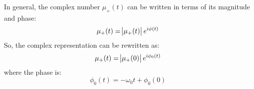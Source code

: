 \begin{enumerate}
    In general, the complex number ${\mu_{+}}(t)$ can be written in terms of its magnitude and phase:
    \begin{equation}
        {\mu_{+}}(t) = \abs{{\mu_{+}}(t)} e^{i\phi (t)}
    \end{equation}
    So, the complex representation can be rewritten as:
    \begin{equation}
        {\mu_{+}}(t) = \abs{{\mu_{+}}(0)} e^{i\phi_0 (t)}
    \end{equation}
    where the phase is:
    \begin{equation}
        \phi_0(t) = -\omega_0 t + \phi_0(0)
    \end{equation}

\end{enumerate}

\clearpage




